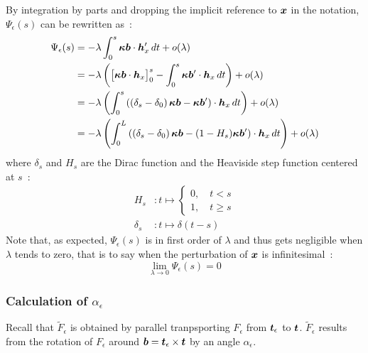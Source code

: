 By integration by parts and dropping the implicit reference to $\boldsymbol{x}$ in the notation, $\Psi_\epsilon(s)$ can be rewritten as~:
\begin{equation}
	\begin{aligned}
		\Psi_\epsilon(s)
		&= - \lambda \int_0^s \boldsymbol{\kappa b}\cdot\boldsymbol{h}'_x \,dt + o(\lambda)\\
		&=  - \lambda \left(\big[\boldsymbol{\kappa b} \cdot  \boldsymbol{h}_x \big]_0^s - \int_0^s \boldsymbol{\kappa b}' \cdot  \boldsymbol{h}_x \,dt\right) + o(\lambda)\\
		&= - \lambda \left(\int_0^s \left(\left(\delta_s-\delta_0\right)\boldsymbol{\kappa b} - \boldsymbol{\kappa b}'\right)\cdot  \boldsymbol{h}_x \,dt\right) + o(\lambda)\\
		&= - \lambda \left(\int_0^L \left(\left(\delta_s-\delta_0\right)\boldsymbol{\kappa b} - (1-H_s)\boldsymbol{\kappa b}'\right)\cdot  \boldsymbol{h}_x \,dt\right) + o(\lambda)
	\end{aligned}
\label{eq:psi}
\end{equation}
where $\delta_s$ and $H_s$ are the Dirac function and the Heaviside step function centered at $s$~:
\begin{subequations}
	\begin{alignat}{1}
		H_s &: t \mapsto \left\{\begin{array}{c}0  , \quad t<s \\1  , \quad t\geqslant s \end{array}\right.
		\\[1em]
		\delta_s &: t \mapsto \delta(t-s)
	\end{alignat}
\end{subequations}
Note that, as expected, $\Psi_\epsilon(s)$ is in first order of $\lambda$ and thus gets negligible when $\lambda$ tends to zero, that is to say when the perturbation of $\boldsymbol{x}$ is infinitesimal~:
\begin{equation}
	\lim_{\lambda \to 0} \Psi_\epsilon(s) = 0
	\label{eq:lim_psi}
\end{equation}



\subsubsection{Calculation of $\alpha_\epsilon$}

Recall that $\tilde{F}_\epsilon$ is obtained by parallel tranpsporting $F_\epsilon$ from $\boldsymbol{t}_\epsilon$ to $\boldsymbol{t}$.
$\tilde{F}_\epsilon$ results from the rotation of $F_\epsilon$ around $\boldsymbol{b} = \boldsymbol{t}_\epsilon \times \boldsymbol{t}$ by an angle $\alpha_\epsilon$.

